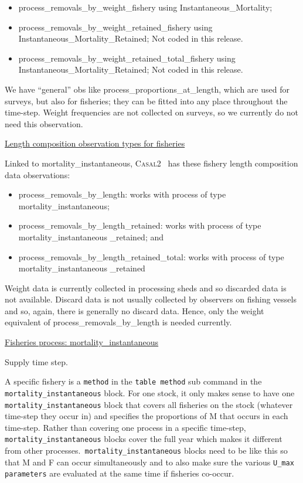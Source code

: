 \documentclass[a4paper,11pt,twoside,pdftex,draft]{article}
\newcommand{\CNAME}{\textsc{Casal2}}
\begin{document}
\begin{itemize}
	\item process\_removals\_by\_weight\_fishery using Instantaneous\_Mortality;
	\item process\_removals\_by\_weight\_retained\_fishery using Instantaneous\_Mortality\_Retained; Not coded in this release.
	\item process\_removals\_by\_weight\_retained\_total\_fishery using Instantaneous\_Mortality\_Retained;  Not coded in this release.
\end{itemize}


We have ``general'' obs like process\_proportions\_at\_length, which are used for surveys, but also for fisheries; they can be fitted into any place throughout the time-step. Weight frequencies are not collected on surveys, so we currently do not need this observation.

\bigskip
\underline{Length composition observation types for fisheries}


Linked to mortality\_instantaneous, \CNAME~ has these fishery length composition data observations:

\begin{itemize}
	\item process\_removals\_by\_length: works with process of type mortality\_instantaneous;
	\item process\_removals\_by\_length\_retained: works with process of type mortality\_instantaneous \_retained; and
	\item process\_removals\_by\_length\_retained\_total: works with process of type mortality\_instantaneous \_retained
\end{itemize}

Weight data is currently collected in processing sheds and so discarded data is not available. Discard data is not usually collected by observers on fishing vessels and so, again, there is generally no discard data. Hence, only the weight equivalent of process\_removals\_by\_length is needed currently.


\bigskip
\underline{Fisheries process: mortality\_instantaneous}

Supply time step.

A specific fishery is a \texttt{method} in the \texttt{table method} sub command in the   \texttt{mortality\_instantaneous} block. For one stock, it only makes sense to have one \texttt{mortality\_instantaneous} block that covers all fisheries on the stock (whatever time-step they occur in) and specifies the proportions of M that occurs in each time-step. Rather than covering one process in a specific time-step, \texttt{mortality\_instantaneous} blocks cover the full year which makes it different from other processes.\texttt{ mortality\_instantaneous} blocks need to be like this so that M and F can occur simultaneously and to also make sure the various \texttt{U\_max parameters} are evaluated at the same time if fisheries co-occur.
\end{document}
